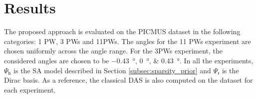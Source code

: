 \documentclass[conference]{IEEEtran}
\begin{document}
\section{Results}
\label{sec:results}
The proposed approach is evaluated on the PICMUS dataset in the following categories: 1 PW, 3 PWs and 11PWs. The angles for the 11 PWs experiment are chosen uniformly across the angle range. For the 3PWs experiment, the considered angles are chosen to be \SIlist{-0.43; 0; 0.43}{\degree}. In all the experiments, $\mathsf{\Psi_b}$ is the SA model described in Section \ref{subsec:sparsity_prior} and $\mathsf{\Psi_r}$ is the Dirac basis. As a reference, the classical DAS is also computed on the dataset for each experiment.
\newlength{\CarotidFigWidth} \setlength{\CarotidFigWidth}{0.3\textwidth}
\newlength{\CarotidFigHeight}
\end{document}
